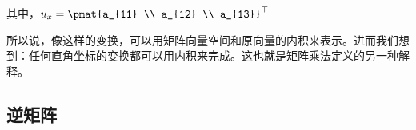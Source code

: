 其中，$u_{x} = \pmat{a_{11} \\ a_{12} \\ a_{13}}^{\top}$

所以说，像这样的变换，可以用矩阵向量空间和原向量的内积来表示。进而我们想到：任何直角坐标的变换都可以用内积来完成。这也就是矩阵乘法定义的另一种解释。



\subsection{逆矩阵}

